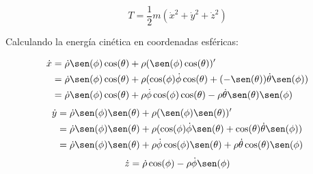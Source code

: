 \begin{equation*}
    T=\frac{1}{2}m(\dot{x}^2+\dot{y}^2+\dot{z}^2)
\end{equation*}

Calculando la energía cinética en coordenadas esféricas:

\begin{equation*}
\begin{split}
    \dot{x}&=\dot{\rho}\sen(\phi)\cos(\theta)+
             \rho(\sen(\phi)\cos(\theta))'\\
           &=\dot{\rho}\sen(\phi)\cos(\theta)+
             \rho(\cos(\phi)\dot{\phi}\cos(\theta)+
             (-\sen(\theta))\dot{\theta}\sen(\phi))\\
           &=\dot{\rho}\sen(\phi)\cos(\theta)+
             \rho\dot{\phi}\cos(\phi)\cos(\theta)-
             \rho\dot{\theta}\sen(\theta)\sen(\phi)
\end{split}
\end{equation*}
\begin{equation*}
\begin{split}
    \dot{y}&=\dot{\rho}\sen(\phi)\sen(\theta)+
             \rho(\sen(\phi)\sen(\theta))'\\
           &=\dot{\rho}\sen(\phi)\sen(\theta)+
             \rho(\cos(\phi)\dot{\phi}\sen(\theta)+
             \cos(\theta)\dot{\theta}\sen(\phi))\\
           &=\dot{\rho}\sen(\phi)\sen(\theta)+
             \rho\dot{\phi}\cos(\phi)\sen(\theta)+
             \rho\dot{\theta}\cos(\theta)\sen(\phi)\\
\end{split}
\end{equation*}
\begin{equation*}
    \dot{z}=\dot{\rho}\cos(\phi)-\rho\dot{\phi}\sen(\phi)
\end{equation*}

